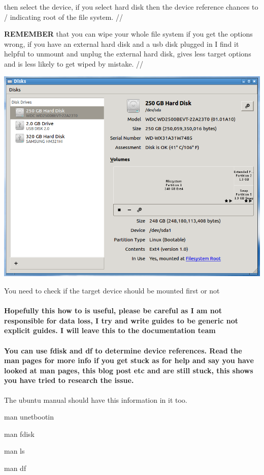 \documentclass[12pt,a4paper]{book}
\begin{document}
then select the device, if you select hard disk then the device reference chances to / indicating root of the file system. //

\textbf{REMEMBER} that you can wipe your whole file system if you get the options wrong,  if you have an external hard disk and a usb disk plugged in I find it helpful to unmount and unplug the external hard disk,  gives less target options and is less likely to get wiped by mistake. //

 
\begin{center}
\includegraphics[width=0.7\linewidth]{unetbootin4}
\end{center}
You need to check if the target device should be mounted first or not


\paragraph{Hopefully this how to is useful,  please be careful as I am not responsible for data loss,  I try and write guides to be generic not explicit guides.  I will leave this to the documentation team}

\paragraph{You can use fdisk and df to determine device references. Read the man pages for more info if you get stuck as for help and say you have looked at man pages,  this blog post etc and are still stuck,  this shows you have tried to research the issue.}

The ubuntu manual should have this information in it too.

man unetbootin

man fdisk

man ls

man df
\end{document}
